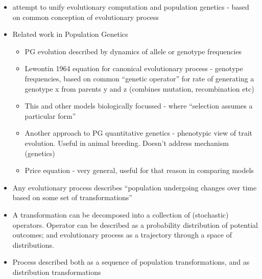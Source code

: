 \begin{itemize}
	\item
	
	attempt to unify evolutionary computation and population genetics -
	based on common conception of evolutionary process
	
	\item
	
	Related work in Population Genetics
	
	
	\begin{itemize}
		\item
		
		PG evolution described by dynamics of allele or genotype frequencies
		
		\item
		
		Lewontin 1964 equation for canonical evolutionary process - genotype
		frequencies, based on common ``genetic operator'' for rate of
		generating a genotype x from parents y and z (combines mutation,
		recombination etc)
		
		\item
		
		This and other models biologically focussed - where ``selection
		assumes a particular form''
		
		\item
		
		Another approach to PG quantitative genetics - phenotypic view of
		trait evolution. Useful in animal breeding. Doesn't address
		mechanism (genetics)
		
		\item
		
		Price equation - very general, useful for that reason in comparing
		models
		
	\end{itemize}
	\item
	
	Any evolutionary process describes ``population undergoing changes
	over time based on some set of transformations''
	
	\item
	
	A transformation can be decomposed into a collection of (stochastic)
	operators. Operator can be described as a probability distribution of
	potential outcomes; and evolutionary process as a trajectory through a
	space of distributions.
	
	\item
	
	Process described both as a sequence of population transformations,
	and as distribution transformations
	

\end{itemize}
